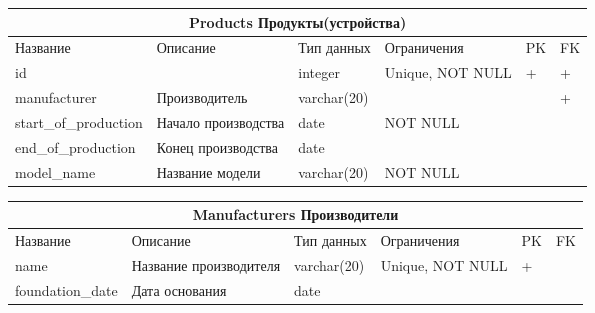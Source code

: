 \documentclass{article}
\begin{document}
\begin{tabular}{ |p{4.5cm}|p{4cm}|p{3cm}|p{3cm}|p{2cm}|p{1cm}|  }
\hline
\multicolumn{6}{|c|}{Products Продукты(устройства)} \\
\hline
Название & Описание & Тип данных & Ограничения & PK & FK\\
\hline
id                                  &   %
                                    &   %
integer                             &   %
Unique, NOT NULL                    &   %
 +                                  &   %
 +                                  \\  %
\hline
manufacturer                        &   %
Производитель                       &   %
varchar(20)                         &   %
                                    &   %
                                    &   %
 +                                  \\  %
\hline
start\_of\_production               &   %
Начало производства                 &   %
date                                &   %
NOT NULL                            &   %
                                    &   %
                                    \\  %
\hline
end\_of\_production                 &   %
Конец производства                  &   %
date                                &   %
                                    &   %
                                    &   %
                                    \\  %
\hline
model\_name                         &   %
Название модели                     &   %
varchar(20)                         &   %
NOT NULL                            &   %
                                    &   %
                                    \\  %
\hline
\end{tabular}

\begin{tabular}{ |p{4.5cm}|p{4cm}|p{3cm}|p{3cm}|p{2cm}|p{1cm}| }
\hline
\multicolumn{6}{|c|}{Manufacturers Производители} \\
\hline
Название & Описание & Тип данных & Ограничения & PK & FK\\
\hline
name                                &   %
Название производителя              &   %
varchar(20)                         &   %
Unique, NOT NULL                    &   %
 +                                  &   %
                                    \\  %
\hline
foundation\_date                    &   %
Дата основания                      &   %
date                                &   %
                                    &   %
                                    &   %
                                    \\  %
\hline
\end{tabular}
\end{document}
